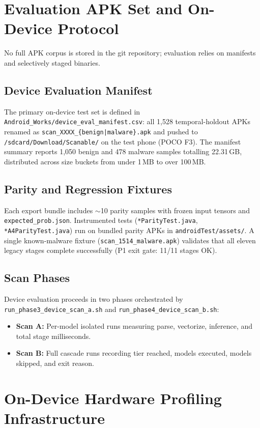 \section{Evaluation APK Set and On-Device Protocol}

No full APK corpus is stored in the git repository; evaluation relies on manifests and selectively staged binaries.

\subsection{Device Evaluation Manifest}
The primary on-device test set is defined in \texttt{Android\_Works/device\_eval\_manifest.csv}: all 1,528 temporal-holdout APKs renamed as \texttt{scan\_XXXX\_\{benign|malware\}.apk} and pushed to \texttt{/sdcard/Download/Scanable/} on the test phone (POCO F3). The manifest summary reports 1,050 benign and 478 malware samples totalling 22.31\,GB, distributed across size buckets from under 1\,MB to over 100\,MB.

\subsection{Parity and Regression Fixtures}
Each export bundle includes $\sim$10 parity samples with frozen input tensors and \texttt{expected\_prob.json}. Instrumented tests (\texttt{*ParityTest.java}, \texttt{*A4ParityTest.java}) run on bundled parity APKs in \texttt{androidTest/assets/}. A single known-malware fixture (\texttt{scan\_1514\_malware.apk}) validates that all eleven legacy stages complete successfully (P1 exit gate: 11/11 stages OK).

\subsection{Scan Phases}
Device evaluation proceeds in two phases orchestrated by \texttt{run\_phase3\_device\_scan\_a.sh} and \texttt{run\_phase4\_device\_scan\_b.sh}:
\begin{itemize}
 \item \textbf{Scan A:} Per-model isolated runs measuring parse, vectorize, inference, and total stage milliseconds.
 \item \textbf{Scan B:} Full cascade runs recording tier reached, models executed, models skipped, and exit reason.
\end{itemize}

\section{On-Device Hardware Profiling Infrastructure}

